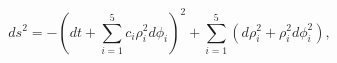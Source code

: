 \begin{equation}
\label{metgodel5}
ds^2 = - \left( dt + \sum_{i=1}^5 c_i \rho_i^2 d\phi_i \right)^2
+ \sum_{i=1}^5 \left( d\rho_i^2 + \rho_i^2 d\phi_i^2 \right),
\end{equation}

